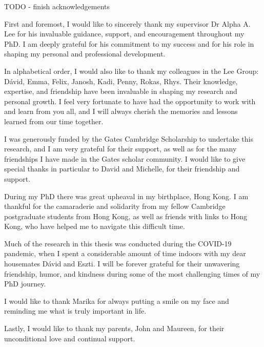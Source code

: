 
\begin{acknowledgements}

TODO - finish acknowledgements

First and foremost, I would like to sincerely thank my supervisor Dr Alpha A. Lee for his invaluable guidance, support, and encouragement throughout my PhD. I am deeply grateful for his commitment to my success and for his role in shaping my personal and professional development.

In alphabetical order, I would also like to thank my colleagues in the Lee Group: Dávid, Emma, Felix, Janosh, Kadi, Penny, Rokas, Rhys. Their knowledge, expertise, and friendship have been invaluable in shaping my research and personal growth. I feel very fortunate to have had the opportunity to work with and learn from you all, and I will always cherish the memories and lessons learned from our time together.

I was generously funded by the Gates Cambridge Scholarship to undertake this research, and I am very grateful for their support, as well as for the many friendships I have made in the Gates scholar community. I would like to give special thanks in particular to David and Michelle, for their friendship and support.

During my PhD there was great upheaval in my birthplace, Hong Kong. I am thankful for the camaraderie and solidarity from my fellow Cambridge postgraduate students from Hong Kong, as well as friends with links to Hong Kong, who have helped me to navigate this difficult time.

Much of the research in this thesis was conducted during the COVID-19 pandemic, when I spent a considerable amount of time indoors with my dear housemates Dávid and Eszti. I will be forever grateful for their unwavering friendship, humor, and kindness during some of the most challenging times of my PhD journey.

I would like to thank Marika for always putting a smile on my face and reminding me what is truly important in life.

Lastly, I would like to thank my parents, John and Maureen, for their unconditional love and continual support.

\end{acknowledgements}
